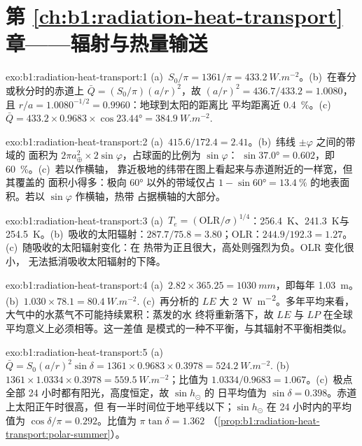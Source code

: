 \section*{第 \ref{ch:b1:radiation-heat-transport} 章——辐射与热量输送}

\begin{solution}{exo:b1:radiation-heat-transport:1}
(a)~$S_0/\pi = 1361/\pi = \qty{433.2}{W.m^{-2}}$。(b)~在春分或秋分时的赤道上
$\bar Q = (S_0/\pi)(a/r)^2$，故 $(a/r)^2 = 436.7/433.2 = 1.0080$，且 $r/a =
1.0080^{-1/2} = 0.9960$：地球到太阳的距离比
平均距离近 \qty{0.4}{\percent}。(c)~$\bar Q = 433.2 \times 0.9683 \times \cos\ang{23.44} =
\qty{384.9}{W.m^{-2}}$.
\end{solution}

\begin{solution}{exo:b1:radiation-heat-transport:2}
(a)~$415.6/172.4 = 2.41$。(b)~纬线 $\pm\varphi$ 之间的带域的
面积为 $2\pi a_\oplus^2 \times 2\sin\varphi$，占球面的比例为 $\sin\varphi$：
$\sin\ang{37.0} = 0.602$，即 \qty{60}{\percent}。(c)~若以作横轴，
靠近极地的纬带在图上看起来与赤道附近的一样宽，但其覆盖的
面积小得多：极向 \ang{60} 以外的带域仅占 $1 - \sin\ang{60} =
\qty{13.4}{\percent}$ 的地表面积。若以 $\sin\varphi$ 作横轴，热带
占据横轴的大部分。
\end{solution}

\begin{solution}{exo:b1:radiation-heat-transport:3}
(a)~$T_e = (\text{OLR}/\sigma)^{1/4}$：\qty{256.4}{K}、\qty{241.3}{K}与
\qty{254.5}{K}。(b)~吸收的太阳辐射：$287.7/75.8 = 3.80$；OLR：$244.9/192.3 =
1.27$。(c)~随吸收的太阳辐射变化：在
热带为正且很大，高处则强烈为负。OLR 变化很小，
无法抵消吸收太阳辐射的下降。
\end{solution}

\begin{solution}{exo:b1:radiation-heat-transport:4}
(a)~$2.82 \times 365.25 = \qty{1030}{mm}$，即每年 \qty{1.03}{m}。(b)~$1.030 \times
78.1 = \qty{80.4}{W.m^{-2}}$.
(c)~再分析的 $LE$ 大 \qty{2}{W.m^{-2}}。多年平均来看，
大气中的水蒸气不可能持续累积：蒸发的水
终将重新落下，故 $LE$ 与 $LP$ 在全球平均意义上必须相等。这一差值
是模式的一种不平衡，与其辐射不平衡相类似。
\end{solution}

\begin{solution}{exo:b1:radiation-heat-transport:5}
(a)~$\bar Q = S_0(a/r)^2\sin\delta = 1361 \times 0.9683 \times 0.3978 =
\qty{524.2}{W.m^{-2}}$. (b)~$1361 \times 1.0334 \times 0.3978 =
\qty{559.5}{W.m^{-2}}$；比值为 $1.0334/0.9683 = 1.067$。(c)~极点
全部 24 小时都有阳光，高度恒定，故 $\sin h_\odot$ 的
日平均值为 $\sin\delta = 0.398$。赤道上太阳正午时很高，但
有一半时间位于地平线以下；$\sin h_\odot$ 在 24 小时内的平均值为 $\cos\delta/\pi =
0.292$。比值为 $\pi\tan\delta = 1.362$
（\cref{prop:b1:radiation-heat-transport:polar-summer}）。
\end{solution}

